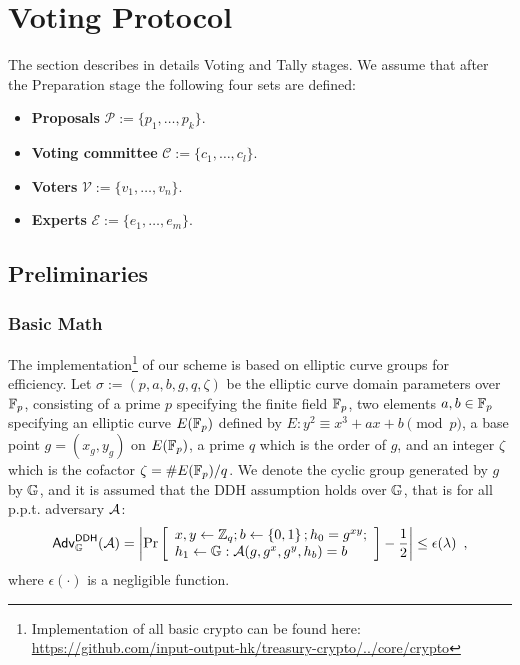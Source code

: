 \section{Voting Protocol}

The section describes in details Voting and Tally stages. We assume that after the Preparation stage the following four sets are defined:
\begin{itemize}[leftmargin=5em, itemsep=0em]
    \item \textbf{Proposals} $\mathcal{P}:=\{p_1,\ldots, p_k \}$.
    \item \textbf{Voting committee} $\mathcal{C}:=\{c_1,\ldots, c_l \}$.
    \item \textbf{Voters} $\mathcal{V}:=\{v_1,\ldots, v_n \}$.
    \item \textbf{Experts} $\mathcal{E}:=\{e_1,\ldots, e_m \}$.
\end{itemize}

\subsection{Preliminaries}

\subsubsection{Basic Math}
The implementation\footnote{Implementation of all basic crypto can be found here:\\ \href{https://github.com/input-output-hk/treasury-crypto/tree/master/src/main/scala/io/iohk/core/crypto}{https://github.com/input-output-hk/treasury-crypto/../core/crypto}} of our scheme is based on elliptic curve groups for efficiency.
Let $\sigma:=(p,a,b,g,q,\zeta)$ be the elliptic curve domain parameters over $\mathbb{F}_p$, consisting of a prime $p$ specifying the finite field $\mathbb{F}_p$, two elements $a,b\in\mathbb{F}_p$ specifying an elliptic curve $E(\mathbb{F}_p)$ defined by
$E: y^2\equiv x^3 + ax + b \pmod p$,
a base point $g=(x_g,y_g)$ on $E(\mathbb{F}_p)$, a prime $q$ which is the order of $g$, and an integer $\zeta$ which is the cofactor $\zeta=\#E(\mathbb{F}_p)/q$.
We denote the cyclic group generated by $g$ by $\mathbb{G}$, and it is assumed that the DDH assumption holds over $\mathbb{G}$, that is for all p.p.t. adversary $\mathcal{A}$:
$$
\mathsf{Adv}^{\mathsf{DDH}}_{\mathbb{G}}(\mathcal{A}) = \left| \Pr\left[\begin{array}{l}x,y\leftarrow \mathbb{Z}_q; b\leftarrow\left\{0,1\right\};h_0=g^{xy};\\
h_1\leftarrow\mathbb{G}:\mathcal{A}(g,g^x,g^y,h_b)=b\\ 
\end{array}   \right]-\frac{1}{2} \right| \leq \epsilon(\lambda)
\enspace,$$
where $\epsilon(\cdot)$ is a negligible function.


